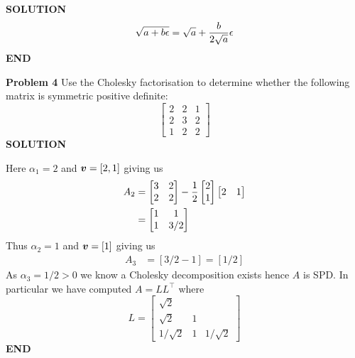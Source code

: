 \documentclass[12pt,a4paper]{article}
\def\v{ {\vc v} }
\begin{document}
\textbf{SOLUTION}
\[
\sqrt{a + b \ensuremath{\epsilon}} = \sqrt{a} + {b \over 2 \sqrt{a}}  \ensuremath{\epsilon}
\]
\textbf{END}

\textbf{Problem 4} Use the Cholesky factorisation to determine whether the following matrix is symmetric positive definite:
\[
\begin{bmatrix} 2 & 2 & 1  \\
2 & 3 & 2\\
1 & 2 & 2
\end{bmatrix}
\]
\textbf{SOLUTION}

Here $\ensuremath{\alpha}_1 = 2$ and $\ensuremath{\bm{\v}} = [2,1]$ giving us
\begin{align*}
A_2 &= \begin{bmatrix}
3&2\\
2&2
\end{bmatrix}-{1 \over 2} \begin{bmatrix} 2 \\ 1 \end{bmatrix}\begin{bmatrix} 2 & 1 \end{bmatrix}\\
&=
\begin{bmatrix}
1&1\\
1&3/2
\end{bmatrix}
\end{align*}
Thus $\ensuremath{\alpha}_2 = 1$ and $\ensuremath{\bm{\v}} = [1]$ giving us
\begin{align*}
A_3 &= [3/2 - 1] = [1/2]
\end{align*}
As $\ensuremath{\alpha}_3 = 1/2 > 0$ we know a Cholesky decomposition exists hence $A$ is SPD. In particular we have computed $A = LL^\ensuremath{\top}$ where
\[
L = \begin{bmatrix}
\sqrt{2} \\
\sqrt{2} & 1 \\
1/\sqrt{2} & 1 & 1/\sqrt{2}
\end{bmatrix}
\]
\textbf{END}
\end{document}
